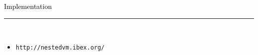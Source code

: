 \documentclass[letter]{seminar}
\begin{document}
\begin{slide}\raggedright
\renewcommand{\leftmargini}{5mm}
{\Large{\textcolor{black}{Implementation}}}
\\\rule{\textwidth}{0.1pt}\\

\begin{itemize}


\item
         {\texttt{http://nestedvm.ibex.org/}}
    


\end{itemize}


\end{slide}
\end{document}
